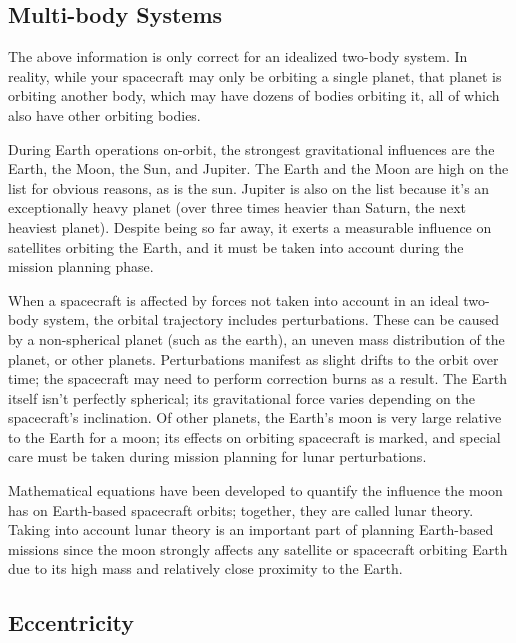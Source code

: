 
\subsection{Multi-body Systems}

The above information is only correct for an idealized two-body
system. In reality, while your spacecraft may only be orbiting a
single planet, that planet is orbiting another body, which may have
dozens of bodies orbiting it, all of which also have other orbiting
bodies.

During Earth operations on-orbit, the strongest gravitational
influences are the Earth, the Moon, the Sun, and Jupiter. The Earth
and the Moon are high on the list for obvious reasons, as is the
sun. Jupiter is also on the list because it's an exceptionally heavy
planet (over three times heavier than Saturn, the next heaviest
planet). Despite being so far away, it exerts a measurable influence
on satellites orbiting the Earth, and it must be taken into account
during the mission planning phase.


When a spacecraft is affected by forces not taken into account in an
ideal two-body system, the orbital trajectory includes
perturbations. These can be caused by a non-spherical planet (such as
the earth), an uneven mass distribution of the planet, or other
planets. Perturbations manifest as slight drifts to the orbit over
time; the spacecraft may need to perform correction burns as a
result. The Earth itself isn't perfectly spherical; its gravitational
force varies depending on the spacecraft's inclination. Of other
planets, the Earth's moon is very large relative to the Earth for a
moon; its effects on orbiting spacecraft is marked, and special care
must be taken during mission planning for lunar perturbations.

Mathematical equations have been developed to quantify the influence
the moon has on Earth-based spacecraft orbits; together, they are
called lunar theory. Taking into account lunar theory is an important
part of planning Earth-based missions since the moon strongly affects
any satellite or spacecraft orbiting Earth due to its high mass and
relatively close proximity to the Earth.

\subsection{Eccentricity}

